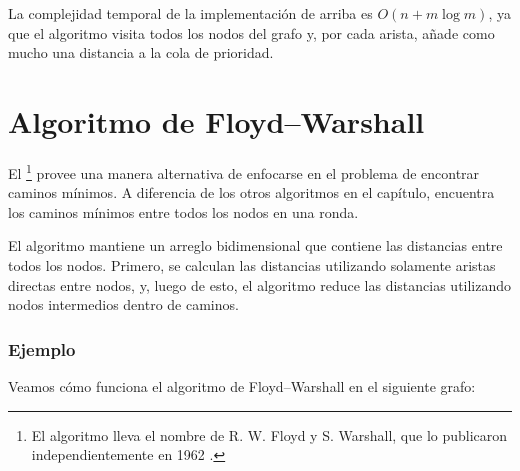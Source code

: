 La complejidad temporal de la implementación de arriba es
$O(n+m \log m)$, ya que el algoritmo visita todos los nodos del grafo
y, por cada arista, añade como mucho una distancia a la cola de prioridad.

\section{Algoritmo de Floyd--Warshall}


El \footnote{El algoritmo lleva
    el nombre de R. W. Floyd y S. Warshall,
    que lo publicaron independientemente en 1962 \cite{flo62,war62}.}
provee una manera alternativa de enfocarse en el problema de encontrar
caminos mínimos. A diferencia de los otros algoritmos en el capítulo,
encuentra los caminos mínimos entre todos los nodos en una ronda.

El algoritmo mantiene un arreglo bidimensional que contiene las
distancias entre todos los nodos. Primero, se calculan las distancias
utilizando solamente aristas directas entre nodos, y, luego de esto,
el algoritmo reduce las distancias utilizando nodos intermedios
dentro de caminos.

\subsubsection{Ejemplo}

Veamos cómo funciona el algoritmo de Floyd--Warshall en
el siguiente grafo:
\begin{center}
\end{center}

